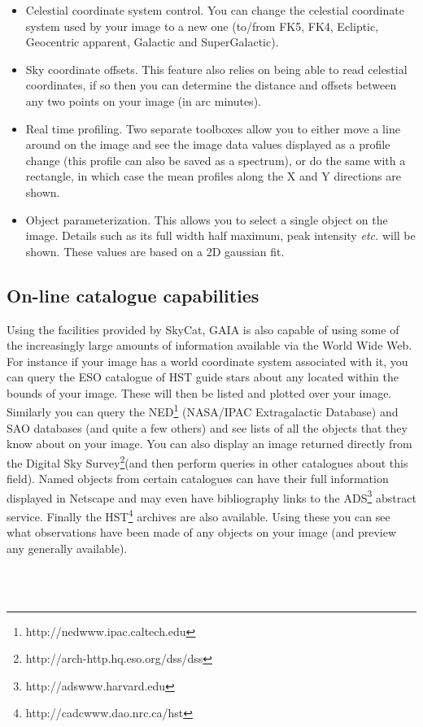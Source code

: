 \documentclass[twoside,11pt]{article}
\newcommand{\htmladdnormallinkfoot}[2]{#1\footnote{#2}}
\newcommand{\htmladdnormallink}[2]{#1}
\newcommand{\xlabel}[1]{}
\renewcommand{\_}{\texttt{\symbol{95}}}
\begin{document}
\begin{itemize}
\item Celestial coordinate system control. You can change the celestial
  coordinate system used by your image to a new one (to/from FK5,
  FK4, Ecliptic, Geocentric apparent, Galactic and SuperGalactic).

\item Sky coordinate offsets. This feature also relies on being
  able to read celestial coordinates, if so then you can
  determine the distance and offsets between any two points on
  your image (in arc minutes).

\item Real time profiling. Two separate toolboxes allow you to either
  move a line around on the image and see the image data values
  displayed as a profile change (this profile can also be saved as a
  spectrum), or do the same with a rectangle, in which case the mean
  profiles along the X and Y directions are shown.

\item Object parameterization. This allows you to select a single
  object on the image. Details such as its full width half
  maximum, peak intensity {\em etc.} will be shown. These values are
  based on a 2D gaussian fit.
\end{itemize}

\subsection{\xlabel{online_catalogue_capabilities}On-line catalogue capabilities}
Using the facilities provided by
\htmladdnormallink{SkyCat}{http://archive.eso.org/skycat}, GAIA is
also capable of using some of the increasingly large amounts of
information available via the World Wide Web. For instance if your
image has a world coordinate system associated with it, you can query
the ESO catalogue of HST guide stars about any located within the
bounds of your image. These will then be listed and plotted over your
image.  Similarly you can query the
\htmladdnormallinkfoot{NED}{http://nedwww.ipac.caltech.edu}
(NASA/IPAC Extragalactic Database) and SAO databases (and quite a few
others) and see lists of all the objects that they know about on your
image. You can also display an image returned directly from the
\htmladdnormallinkfoot{Digital Sky Survey}
{http://arch-http.hq.eso.org/dss/dss}(and then perform queries in
other catalogues about this field). Named objects from certain
catalogues can have their full information displayed in
\htmladdnormallink{Netscape}{http://home.netscape.com} and may even
have bibliography links to the
\htmladdnormallinkfoot{ADS}{http://adswww.harvard.edu} abstract
service.  Finally the
\htmladdnormallinkfoot{HST}{http://cadcwww.dao.nrc.ca/hst} archives
are also available. Using these you can see what observations have
been made of any objects on your image (and preview any generally
available).
\begin{htmlonly}
\\
\\
\end{htmlonly}
\end{document}
